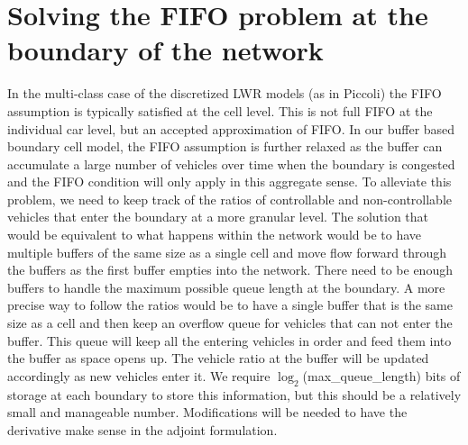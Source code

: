 \documentclass[10pt,a4paper]{article}
\begin{document}
\section{Solving the FIFO problem at the boundary of the network}
\label{sec:FIFO}
In the multi-class case of the discretized LWR models (as in Piccoli) the FIFO assumption is typically satisfied at the cell level. This is not full FIFO at the individual car level, but an accepted approximation of FIFO. In our buffer based boundary cell model, the FIFO assumption is further relaxed as the buffer can accumulate a large number of vehicles over time when the boundary is congested and the FIFO condition will only apply in this aggregate sense. To alleviate this problem, we need to keep track of the ratios of controllable and non-controllable vehicles that enter the boundary at a more granular level. The solution that would be equivalent to what happens within the network would be to have multiple buffers of the same size as a single cell and move flow forward through the buffers as the first buffer empties into the network. There need to be enough buffers to handle the maximum possible queue length at the boundary. A more precise way to follow the ratios would be to have a single buffer that is the same size as a cell and then keep an overflow queue for vehicles that can not enter the buffer. This queue will keep all the entering vehicles in order and feed them into the buffer as space opens up. The vehicle ratio at the buffer will be updated accordingly as new vehicles enter it. We require $\log_{2}$(max\_queue\_length) bits of storage at each boundary to store this information, but this should be a relatively small and manageable number. Modifications will be needed to have the derivative make sense in the adjoint formulation.







\end{document}
